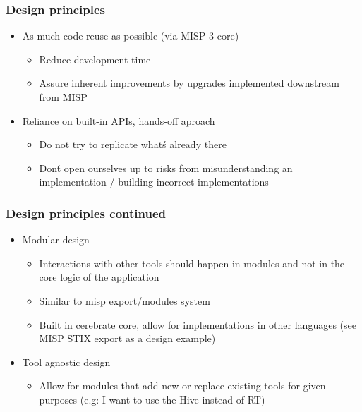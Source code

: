 \begin{frame}
  \frametitle{Design principles}
  \begin{itemize}
    \item As much code reuse as possible (via MISP 3 core)
    \begin{itemize}
      \item Reduce development time
      \item Assure inherent improvements by upgrades implemented downstream from MISP
    \end{itemize}
    \item Reliance on built-in APIs, hands-off aproach
    \begin{itemize}
      \item Do not try to replicate what\'s already there
      \item Don\'t open ourselves up to risks from misunderstanding an implementation / building incorrect implementations
    \end{itemize}
  \end{itemize}
\end{frame}

\begin{frame}
  \frametitle{Design principles continued}
  \begin{itemize}
    \item Modular design
    \begin{itemize}
      \item Interactions with other tools should happen in modules and not in the core logic of the application
      \item Similar to misp export/modules system
      \item Built in cerebrate core, allow for implementations in other languages (see MISP STIX export as a design example)
    \end{itemize}
    \item Tool agnostic design
    \begin{itemize}
      \item Allow for modules that add new or replace existing tools for given purposes (e.g: I want to use the Hive instead of RT)
    \end{itemize}
  \end{itemize}
\end{frame}

